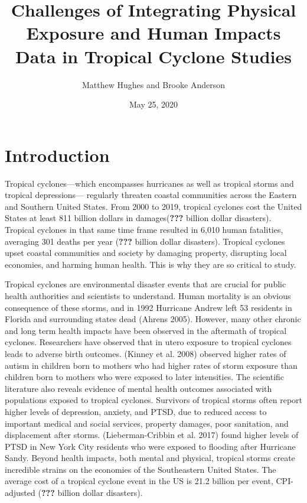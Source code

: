\documentclass[
]{article}
\title{Challenges of Integrating Physical Exposure and Human Impacts Data in
Tropical Cyclone Studies}
\author{Matthew Hughes and Brooke Anderson}
\date{May 25, 2020}
\begin{document}
\maketitle

\hypertarget{introduction}{%
\section{Introduction}\label{introduction}}

Tropical cyclones---which encompasses hurricanes as well as tropical
storms and tropical depressions--- regularly threaten coastal
communities across the Eastern and Southern United States. From 2000 to
2019, tropical cyclones cost the United States at least 811 billion
dollars in damages({\textbf{???}} billion dollar disasters). Tropical
cyclones in that same time frame resulted in 6,010 human fatalities,
averaging 301 deaths per year ({\textbf{???}} billion dollar disasters).
Tropical cyclones upset coastal communities and society by damaging
property, disrupting local economies, and harming human health. This is
why they are so critical to study.

Tropical cyclones are environmental disaster events that are crucial for
public health authorities and scientists to understand. Human mortality
is an obvious consequence of these storms, and in 1992 Hurricane Andrew
left 53 residents in Florida and surrounding states dead (Ahrens 2005).
However, many other chronic and long term health impacts have been
observed in the aftermath of tropical cyclones. Researchers have
observed that in utero exposure to tropical cyclones leads to adverse
birth outcomes. (Kinney et al. 2008) observed higher rates of autism in
children born to mothers who had higher rates of storm exposure than
children born to mothers who were exposed to later intensities. The
scientific literature also reveals evidence of mental health outcomes
associated with populations exposed to tropical cyclones. Survivors of
tropical storms often report higher levels of depression, anxiety, and
PTSD, due to reduced access to important medical and social services,
property damages, poor sanitation, and displacement after storms.
(Lieberman-Cribbin et al. 2017) found higher levels of PTSD in New York
City residents who were exposed to flooding after Hurricane Sandy.
Beyond health impacts, both mental and physical, tropical storms create
incredible strains on the economies of the Southeastern United States.
The average cost of a tropical cyclone event in the US is 21.2 billion
per event, CPI-adjusted ({\textbf{???}} billion dollar disasters).
\end{document}
